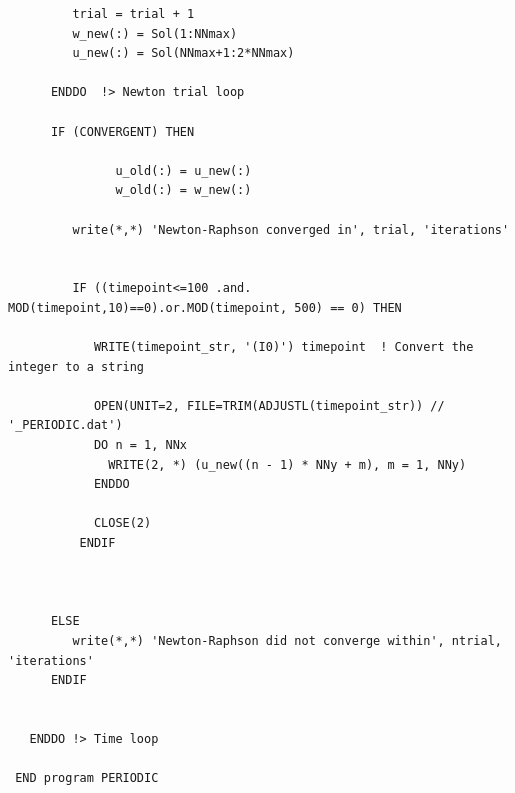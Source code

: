 \documentclass{article}
\begin{document}
\begin{verbatim}
         trial = trial + 1
         w_new(:) = Sol(1:NNmax)
         u_new(:) = Sol(NNmax+1:2*NNmax)

      ENDDO  !> Newton trial loop
      
      IF (CONVERGENT) THEN

               u_old(:) = u_new(:)
               w_old(:) = w_new(:)

         write(*,*) 'Newton-Raphson converged in', trial, 'iterations'


         IF ((timepoint<=100 .and. MOD(timepoint,10)==0).or.MOD(timepoint, 500) == 0) THEN
            
            WRITE(timepoint_str, '(I0)') timepoint  ! Convert the integer to a string
          
            OPEN(UNIT=2, FILE=TRIM(ADJUSTL(timepoint_str)) // '_PERIODIC.dat')
            DO n = 1, NNx
              WRITE(2, *) (u_new((n - 1) * NNy + m), m = 1, NNy)
            ENDDO
          
            CLOSE(2)
          ENDIF

      

      ELSE
         write(*,*) 'Newton-Raphson did not converge within', ntrial, 'iterations'
      ENDIF


   ENDDO !> Time loop

 END program PERIODIC
\end{verbatim}
\end{document}
